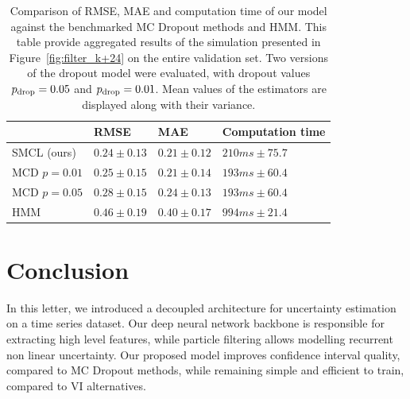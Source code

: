 \documentclass[journal]{IEEEtran}
\begin{document}
\begin{table}[htpb]
	\centering
	\caption{Comparison of RMSE, MAE and computation time of our model against the benchmarked MC Dropout methods and HMM.
		This table provide aggregated results of the simulation presented in Figure~\ref{fig:filter_k+24} on the entire validation set.
		Two versions of the dropout model were evaluated, with dropout values $p_\textnormal{drop}=0.05$ and $p_\textnormal{drop}=0.01$.
		Mean values of the estimators are displayed along with their variance.}
	\label{tab:ci_comparison}
	\begin{tabular}{llll}
		\toprule
		             & RMSE             & MAE             & Computation time  \\
		\toprule
		SMCL (ours)  & $0.24 \pm 0.13$ & $0.21 \pm 0.12$ & $210 ms \pm 75.7$ \\
		MCD $p=0.01$ & $0.25 \pm 0.15$ & $0.21 \pm 0.14$ & $193 ms \pm 60.4$ \\
		MCD $p=0.05$ & $0.28 \pm 0.15$ & $0.24 \pm 0.13$ & $193 ms \pm 60.4$ \\
		HMM          & $0.46 \pm 0.19$ & $0.40 \pm 0.17$ & $994 ms \pm 21.4$ \\
		\bottomrule
	\end{tabular}
\end{table}


\section{Conclusion}%
\label{sec:conclusion}

In this letter, we introduced a decoupled architecture for uncertainty estimation on a time series dataset.
Our deep neural network backbone is responsible for extracting high level features, while particle filtering allows modelling recurrent non linear uncertainty.
Our proposed model improves confidence interval quality, compared to MC Dropout methods, while remaining simple and efficient to train, compared to VI alternatives.
\end{document}
